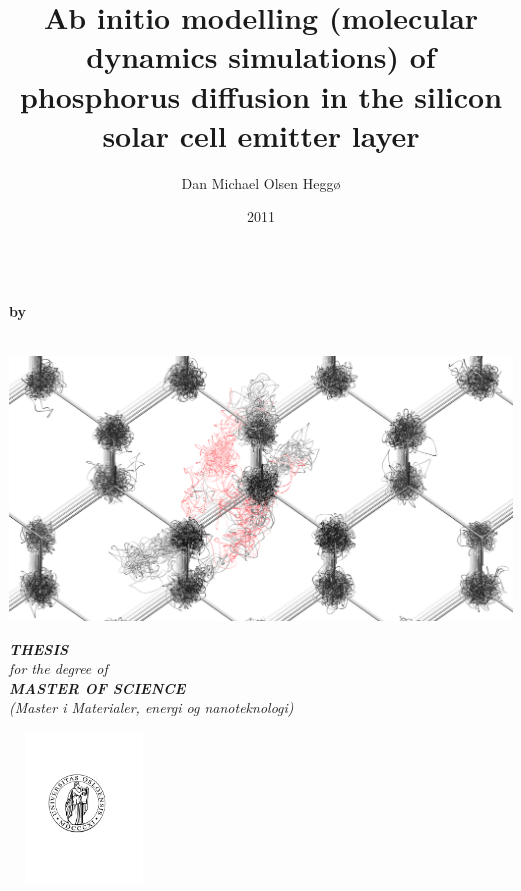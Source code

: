 \documentclass[a4paper]{article}
\begin{document}
\title{Ab initio modelling (molecular dynamics simulations) of phosphorus diffusion in the silicon solar cell emitter layer}
\author{Dan Michael Olsen Heggø}
\date{2011}


\pagestyle{empty}
\begin{center}        %
  \LARGE
  \textbf{\thetitle} \\
  \Large
  \vspace{5mm}
  \textbf{by} \\
  \vspace{5mm}
  \large
  \textbf{\theauthor} \\
  \vspace{12mm}
  \centerline{\includegraphics[width=14cm]{dance1.png}}
  \vspace{12mm}
  \Large
  {\bf{\textsl{THESIS}}} \\
  \textsl{for the degree of} \\
  \vspace{2mm}
  {\bf{\textsl{MASTER OF SCIENCE}}} \\
  \vspace{2mm}
  {\large \textsl {(Master i Materialer, energi og nanoteknologi)}}\\
  \vspace{5mm}
  \centerline{\includegraphics[width=4cm,height=4cm]{uiologo.pdf}}

\end{center}
\end{document}
